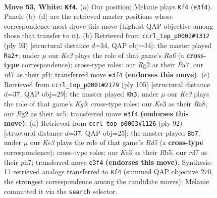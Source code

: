 \documentclass[11pt]{article}
\begin{document}
\clearpage

\begin{figure}[p]\centering
\begin{subfigure}{0.46\textwidth}\centering
\resizebox{\linewidth}{!}{%
\newchessgame
\chessboard[
  setfen={5B2/3r1p1k/5n2/8/p3p2p/P3K2P/5PR1/8 w - - 6 53},
  showmover=false,
  pgfstyle=straightmove, color=movearrow, markmove={e3-f4}
]}
\caption{}
\end{subfigure}\hfill
\begin{subfigure}{0.46\textwidth}\centering
\resizebox{\linewidth}{!}{%
\newchessgame
\chessboard[
  setfen={8/ppp2p2/6kP/3PP3/P4PN1/r7/5K2/8 b - - 8 47},
  showmover=false,
  pgfstyle=straightmove, color=movearrow, markmove={a3-a2}
]}
\caption{}
\end{subfigure}
\\[4pt]
\begin{subfigure}{0.46\textwidth}\centering
\resizebox{\linewidth}{!}{%
\newchessgame
\chessboard[
  setfen={r7/PR6/2p4p/2Nb2pP/3P2k1/8/5K2/8 b - - 0 53},
  showmover=false,
  pgfstyle=straightmove, color=movearrow, markmove={g4-h3}
]}
\caption{}
\end{subfigure}\hfill
\begin{subfigure}{0.46\textwidth}\centering
\resizebox{\linewidth}{!}{%
\newchessgame
\chessboard[
  setfen={8/3n3p/1p3k2/1R1B1p2/P3p3/4P2P/5P1K/2r5 w - - 14 47},
  showmover=false,
  pgfstyle=straightmove, color=movearrow, markmove={d5-b7}
]}
\caption{}
\end{subfigure}
\caption{\textbf{Move 53, White: \texttt{Kf4}.} (a) Our position; Melanie plays \texttt{Kf4} (\texttt{e3f4}). Panels (b)--(d) are the retrieved master positions whose correspondence most drove this move (highest QAP objective among those that transfer to it). (b) Retrieved from \texttt{ccrl\_top\_p0002\#1312} (ply 93) [structural distance $d$=34, QAP obj=34]: the master played \texttt{Ra2+}; under $\mu$ our \emph{Ke3} plays the role of that game's \emph{Ra6} (a \textbf{cross-type} correspondence); cross-type roles: our \emph{R}g2 as their \emph{P}a7, our \emph{r}d7 as their \emph{p}f4; transferred move \texttt{e3f4} \textbf{(endorses this move)}. (c) Retrieved from \texttt{ccrl\_top\_p0001\#2179} (ply 105) [structural distance $d$=37, QAP obj=29]: the master played \texttt{Kh3}; under $\mu$ our \emph{Ke3} plays the role of that game's \emph{Kg5}; cross-type roles: our \emph{K}e3 as their \emph{R}a8, our \emph{R}g2 as their \emph{n}c5; transferred move \texttt{e3f4} \textbf{(endorses this move)}. (d) Retrieved from \texttt{ccrl\_top\_p0003\#1126} (ply 92) [structural distance $d$=37, QAP obj=25]: the master played \texttt{Bb7}; under $\mu$ our \emph{Ke3} plays the role of that game's \emph{Bd5} (a \textbf{cross-type} correspondence); cross-type roles: our \emph{K}e3 as their \emph{R}b5, our \emph{r}d7 as their \emph{p}h7; transferred move \texttt{e3f4} \textbf{(endorses this move)}. Synthesis: 11 retrieved analogs transferred to \texttt{Kf4} (summed QAP objective 270, the strongest correspondence among the candidate moves); Melanie committed it via the \texttt{search} selector.}
\label{fig:thought-m104}
\end{figure}
\end{document}
